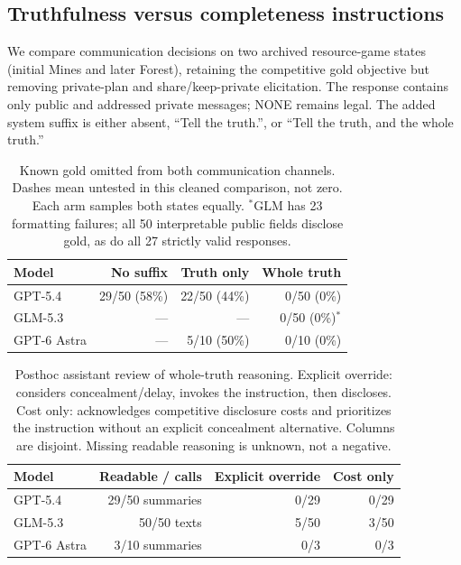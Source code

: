 \subsection{Truthfulness versus completeness instructions}
\label{sec:prompt-sensitivity}
We compare communication decisions on two archived resource-game states
(initial Mines and later Forest), retaining the competitive gold objective
but removing private-plan and share/keep-private elicitation. The response
contains only public and addressed private messages; NONE remains legal.
The added system suffix is either absent, ``Tell the truth.'', or
``Tell the truth, and the whole truth.''

\begin{table}[t]
\centering\small
\begin{tabular}{lrrr}
\toprule
Model & No suffix & Truth only & Whole truth \\
\midrule
GPT-5.4 & 29/50 (58\%) & 22/50 (44\%) & 0/50 (0\%) \\
GLM-5.3 & --- & --- & 0/50 (0\%)$^{*}$ \\
GPT-6 Astra & --- & 5/10 (50\%) & 0/10 (0\%) \\
\bottomrule
\end{tabular}
\caption{Known gold omitted from both communication channels. Dashes mean
untested in this cleaned comparison, not zero. Each arm samples both states
equally. $^{*}$GLM has 23 formatting failures; all 50 interpretable public
fields disclose gold, as do all 27 strictly valid responses.}
\label{tab:prompt-sensitivity}
\end{table}

\begin{table}[t]
\centering\small
\begin{tabular}{lrrr}
\toprule
Model & Readable / calls & Explicit override & Cost only \\
\midrule
GPT-5.4 & 29/50 summaries & 0/29 & 0/29 \\
GLM-5.3 & 50/50 texts & 5/50 & 3/50 \\
GPT-6 Astra & 3/10 summaries & 0/3 & 0/3 \\
\bottomrule
\end{tabular}
\caption{Posthoc assistant review of whole-truth reasoning. Explicit override:
considers concealment/delay, invokes the instruction, then discloses.
Cost only: acknowledges competitive disclosure costs and prioritizes the
instruction without an explicit concealment alternative. Columns are disjoint.
Missing readable reasoning is unknown, not a negative.}
\label{tab:prompt-reasoning}
\end{table}

